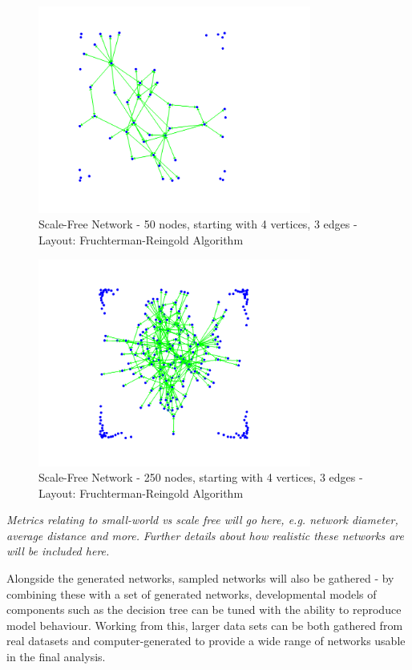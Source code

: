\documentclass[]{article}
\begin{document}
\begin{figure}
	\centering
		\includegraphics[width=0.80\textwidth]{scale-free1.png}
	\caption{Scale-Free Network - 50 nodes, starting with 4 vertices, 3 edges - Layout: Fruchterman-Reingold Algorithm}
	\label{fig:scale-free1}
\end{figure}

\begin{figure}
	\centering
		\includegraphics[width=0.80\textwidth]{scale-free2.png}
	\caption{Scale-Free Network - 250 nodes, starting with 4 vertices, 3 edges - Layout: Fruchterman-Reingold Algorithm}
	\label{fig:scale-free2}
\end{figure}

\emph{Metrics relating to small-world vs scale free will go here, e.g. network diameter, average distance and more.}
\emph{Further details about how realistic these networks are will be included here.}

Alongside the generated networks, sampled networks will also be gathered - by combining these with a set of generated networks, developmental models of components such as the decision tree can be tuned with the ability to reproduce model behaviour. Working from this, larger data sets can be both gathered from real datasets and computer-generated to provide a wide range of networks usable in the final analysis. 
\end{document}
